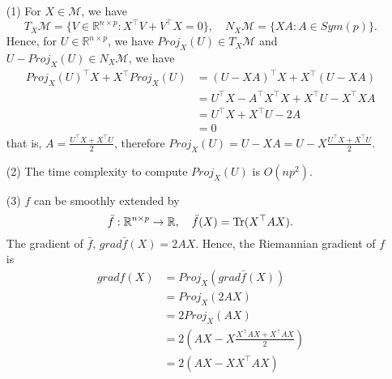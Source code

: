 \documentclass[en, oneside]{assignment}
\begin{document}
\begin{sol}
    \begin{itemize}
        \item[(1)] For $X \in \mathcal{M}$, we have
        \begin{equation*}
            T_X \mathcal{M} = \{V \in \mathbb{R} ^{n \times p} : X ^\top V + V ^\top X = 0\}, 
            \quad N_X \mathcal{M} = \{ X A: A \in Sym(p) \}.
        \end{equation*}
        Hence, for $U \in \mathbb{R} ^{n \times p}$, we have $Proj _X (U) \in T _X \mathcal{M}$ and $U - Proj _X (U) \in N _X \mathcal{M}$, we have
        \begin{align*}
            Proj_X (U) ^\top X + X ^\top Proj_X (U) & = (U - X A) ^\top X + X ^\top (U - X A)\\
            & = U ^\top X - A ^\top X ^\top X + X ^\top U - X ^\top X A\\
            & = U ^\top X + X ^\top U - 2 A\\
            & = 0
        \end{align*}
        that is, $A = \frac{U ^\top X + X ^\top U}{2}$, therefore $Proj _X (U) = U - X A = U - X \frac{U ^\top X + X ^\top U}{2}$.
        \item[(2)] The time complexity to compute $Proj _X (U)$ is $O(np ^2)$.
        \item[(3)] $f$ can be smoothly extended by 
        \begin{equation*}
            \bar{f}: \mathbb{R} ^{n \times p} \to \mathbb{R}, \quad \bar{f}(X) = \operatorname{Tr} (X ^\top A X).
        \end{equation*}
        The gradient of $\bar{f}$, $grad \bar{f}(X) = 2 A X$. Hence, the Riemannian gradient of $f$ is
        \begin{align*}
            gradf(X) & = Proj _X (grad \bar{f}(X))\\
            & = Proj _X (2 A X)\\
            & = 2 Proj _X (A X)\\
            & = 2 (A X - X \frac{X ^\top A X + X ^\top A X}{2})\\
            & = 2 (A X - X X ^\top A X)\\
        \end{align*}
    \end{itemize}
\end{sol}
\end{document}
